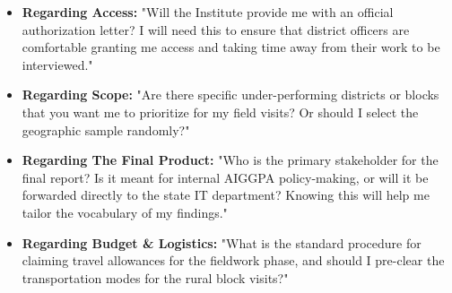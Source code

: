 \documentclass[11pt,a4paper]{article}
\begin{document}
\vspace{0.3cm}
\begin{itemize}[itemsep=15pt]
    \item \textbf{Regarding Access:} "Will the Institute provide me with an official authorization letter? I will need this to ensure that district officers are comfortable granting me access and taking time away from their work to be interviewed."
    
    \item \textbf{Regarding Scope:} "Are there specific under-performing districts or blocks that you want me to prioritize for my field visits? Or should I select the geographic sample randomly?"

    \item \textbf{Regarding The Final Product:} "Who is the primary stakeholder for the final report? Is it meant for internal AIGGPA policy-making, or will it be forwarded directly to the state IT department? Knowing this will help me tailor the vocabulary of my findings."
    
    \item \textbf{Regarding Budget \& Logistics:} "What is the standard procedure for claiming travel allowances for the fieldwork phase, and should I pre-clear the transportation modes for the rural block visits?"
\end{itemize}
\end{document}
